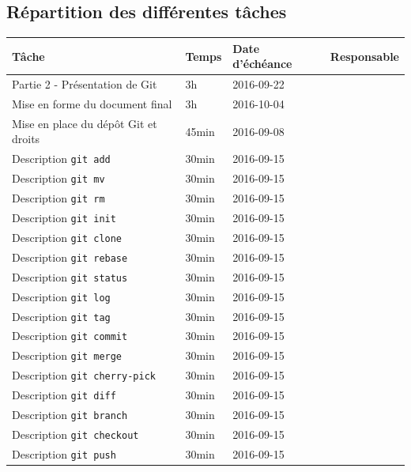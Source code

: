 \documentclass[11pt,canadien]{article}
\begin{document}
\newpage
\begin{appendices} %

\section{Répartition des différentes tâches}
\begin{tabular}{l l l l}
	\textbf{Tâche} & \textbf{Temps} & \textbf{Date d'échéance} & \textbf{Responsable}
	\\ \hline
	   Partie 2 - Présentation de Git       & 3h    & 2016-09-22 & \antoine
	\\ Mise en forme du document final      & 3h    & 2016-10-04 & \kevin
	\\ Mise en place du dépôt Git et droits & 45min & 2016-09-08 & \joffrey
	\\ Description \texttt{git add}         & 30min & 2016-09-15 & \estelle
	\\ Description \texttt{git mv}          & 30min & 2016-09-15 & \estelle
	\\ Description \texttt{git rm}          & 30min & 2016-09-15 & \estelle
	\\ Description \texttt{git init}        & 30min & 2016-09-15 & \julien
	\\ Description \texttt{git clone}       & 30min & 2016-09-15 & \julien
	\\ Description \texttt{git rebase}      & 30min & 2016-09-15 & \julien
	\\ Description \texttt{git status}      & 30min & 2016-09-15 & \valentin
	\\ Description \texttt{git log}         & 30min & 2016-09-15 & \valentin
	\\ Description \texttt{git tag}         & 30min & 2016-09-15 & \valentin
	\\ Description \texttt{git commit}      & 30min & 2016-09-15 & \joffrey
	\\ Description \texttt{git merge}       & 30min & 2016-09-15 & \joffrey
	\\ Description \texttt{git cherry-pick} & 30min & 2016-09-15 & \joffrey
	\\ Description \texttt{git diff}        & 30min & 2016-09-15 & \karen
	\\ Description \texttt{git branch}      & 30min & 2016-09-15 & \karen
	\\ Description \texttt{git checkout}    & 30min & 2016-09-15 & \karen
	\\ Description \texttt{git push}        & 30min & 2016-09-15 & \kevin

\end{tabular}
\end{appendices}
\end{document}
